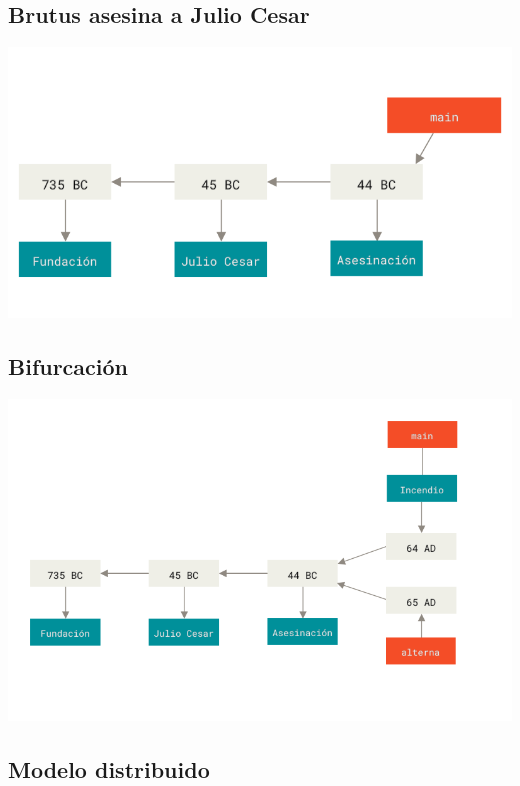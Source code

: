 \subsection{Brutus asesina a Julio Cesar}

\includegraphics{figs/stage3.png}

\subsection{Bifurcación}

\includegraphics{figs/stage4.png}

\subsection{Modelo distribuido}


